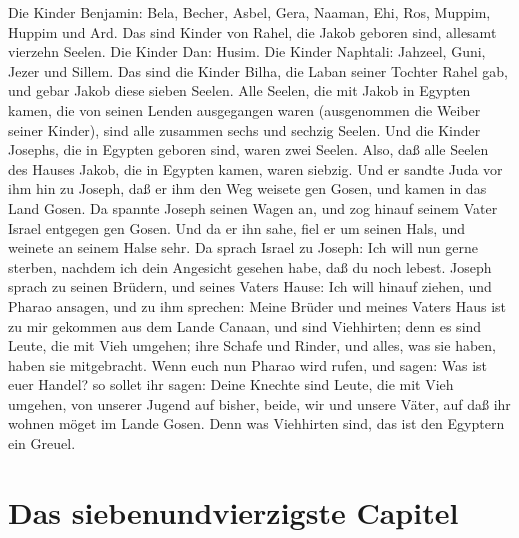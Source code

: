 \begin{schriftzitat}
Die Kinder Benjamin: Bela, Becher, Asbel, Gera, Naaman, Ehi, Ros, Muppim, Huppim und Ard. Das sind Kinder von Rahel, die Jakob geboren sind, allesamt vierzehn Seelen. Die Kinder Dan: Husim. Die Kinder Naphtali: Jahzeel, Guni, Jezer und Sillem. Das sind die Kinder Bilha, die Laban seiner Tochter Rahel gab, und gebar Jakob diese sieben Seelen. Alle Seelen, die mit Jakob in Egypten kamen, die von seinen Lenden ausgegangen waren (ausgenommen die Weiber seiner Kinder), sind alle zusammen sechs und sechzig Seelen. Und die Kinder Josephs, die in Egypten geboren sind, waren zwei Seelen. Also, daß alle Seelen des Hauses Jakob, die in Egypten kamen, waren siebzig. Und er sandte Juda vor ihm hin zu Joseph, daß er ihm den Weg weisete gen Gosen, und kamen in das Land Gosen. Da spannte Joseph seinen Wagen an, und zog hinauf seinem Vater Israel entgegen gen Gosen. Und da er ihn sahe, fiel er um seinen Hals, und weinete an seinem Halse sehr. Da sprach Israel zu Joseph: Ich will nun gerne sterben, nachdem ich dein Angesicht gesehen habe, daß du noch lebest. Joseph sprach zu seinen Brüdern, und seines Vaters Hause: Ich will hinauf ziehen, und Pharao ansagen, und zu ihm sprechen: Meine Brüder und meines Vaters Haus ist zu mir gekommen aus dem Lande Canaan, und sind Viehhirten; denn es sind Leute, die mit Vieh umgehen; ihre Schafe und Rinder, und alles, was sie haben, haben sie mitgebracht. Wenn euch nun Pharao wird rufen, und sagen: Was ist euer Handel? so sollet ihr sagen: Deine Knechte sind Leute, die mit Vieh umgehen, von unserer Jugend auf bisher, beide, wir und unsere Väter, auf daß ihr wohnen möget im Lande Gosen. Denn was Viehhirten sind, das ist den Egyptern ein Greuel.
\end{schriftzitat}

\section{Das siebenundvierzigste Capitel}

